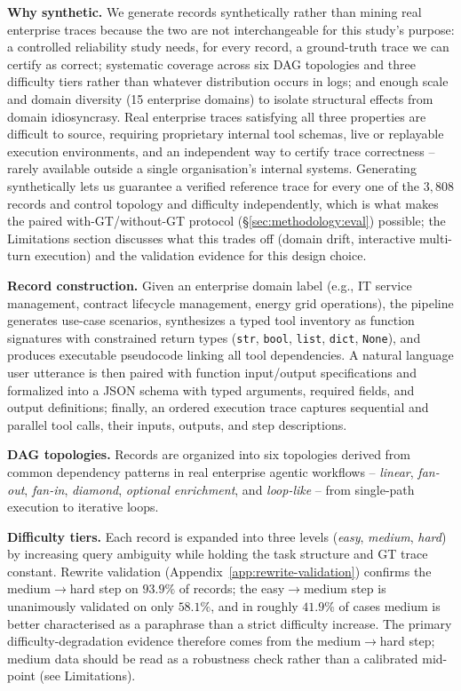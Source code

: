 \noindent\textbf{Why synthetic.} We generate records synthetically rather than mining real enterprise traces because the two are not interchangeable for this study's purpose: a controlled reliability study needs, for every record, a ground-truth trace we can certify as correct; systematic coverage across six DAG topologies and three difficulty tiers rather than whatever distribution occurs in logs; and enough scale and domain diversity (15 enterprise domains) to isolate structural effects from domain idiosyncrasy. Real enterprise traces satisfying all three properties are difficult to source, requiring proprietary internal tool schemas, live or replayable execution environments, and an independent way to certify trace correctness -- rarely available outside a single organisation's internal systems. Generating synthetically lets us guarantee a verified reference trace for every one of the $3{,}808$ records and control topology and difficulty independently, which is what makes the paired with-GT/without-GT protocol (\S\ref{sec:methodology:eval}) possible; the Limitations section discusses what this trades off (domain drift, interactive multi-turn execution) and the validation evidence for this design choice.

\noindent\textbf{Record construction.} Given an enterprise domain label (e.g., IT service management, contract lifecycle management, energy grid operations), the pipeline generates use-case scenarios, synthesizes a typed tool inventory as function signatures with constrained return types (\texttt{str}, \texttt{bool}, \texttt{list}, \texttt{dict}, \texttt{None}), and produces executable pseudocode linking all tool dependencies. A natural language user utterance is then paired with function input/output specifications and formalized into a JSON schema with typed arguments, required fields, and output definitions; finally, an ordered execution trace captures sequential and parallel tool calls, their inputs, outputs, and step descriptions.

\noindent\textbf{DAG topologies.} Records are organized into six topologies derived from common dependency patterns in real enterprise agentic workflows -- \textit{linear}, \textit{fan-out}, \textit{fan-in}, \textit{diamond}, \textit{optional enrichment}, and \textit{loop-like} -- from single-path execution to iterative loops.

\noindent\textbf{Difficulty tiers.} Each record is expanded into three levels (\textit{easy}, \textit{medium}, \textit{hard}) by increasing query ambiguity while holding the task structure and GT trace constant. Rewrite validation (Appendix~\ref{app:rewrite-validation}) confirms the medium$\to$hard step on $93.9\%$ of records; the easy$\to$medium step is unanimously validated on only $58.1\%$, and in roughly $41.9\%$ of cases medium is better characterised as a paraphrase than a strict difficulty increase. The primary difficulty-degradation evidence therefore comes from the medium$\to$hard step; medium data should be read as a robustness check rather than a calibrated mid-point (see Limitations).

